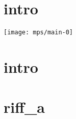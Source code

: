 \documentclass[11pt]{article}
\begin{document}
    \begin{center}
    \end{center}
    \section*{intro}
    \texttt{[image: mps/main-0]}


    \section{intro}
    

    \section{riff_a}
    

    \newpage
    




%    


%    
\end{document}
